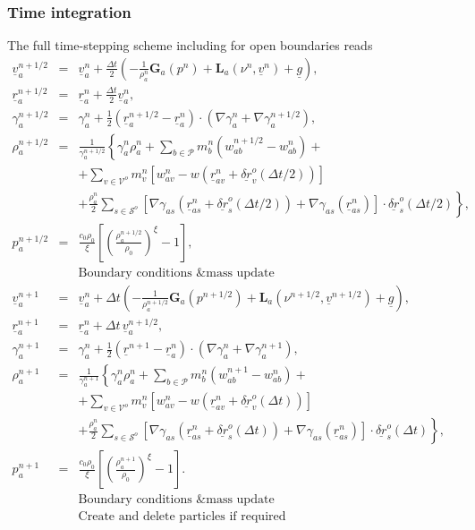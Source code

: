 \documentclass[12pt]{memoir}
\newcommand{\uvec}[1]{\underline{#1}}
\newcommand{\sumP}{\underset{b \in \mathcal{P}}{\sum}}
\newcommand{\Grad}{\textbf{G}}
\newcommand{\Lap}{\textbf{L}}
\begin{document}
\subsubsection{Time integration}
The full time-stepping scheme including for open boundaries reads
\begin{eqnarray}
\uvec{v}_a^{n+1/2} &=& \uvec{v}_a^n + \frac{\Delta t}{2} \left(
-\frac{1}{\rho^n_a}\Grad_a(p^n) + \Lap_a(\nu^n,\uvec{v}^n) + \uvec{g}
\right),
\label{e:open:pred-corr-ns}
\\
\uvec{r}_a^{n+1/2} &=& \uvec{r}_a^{n} + \frac{\Delta t}{2}
\uvec{v}_a^{n},
\nonumber
\\
\gamma_a^{n+1/2} &=& \gamma_a^{n} + \frac{1}{2}
(\uvec{r}_a^{n+1/2} - \uvec{r}_a^{n}) \cdot (\nabla \gamma_a^n + \nabla \gamma_a^{n+1/2}),
\nonumber
\\
\rho_a^{n+1/2} &=& \frac{1}{\gamma_a^{n+1/2}}\left\{ \gamma_a^n \rho_a^n +
\sumP m_b^n (w_{ab}^{n+1/2} - w_{ab}^n) + \right.
\nonumber
\\
&&\left. + \underset{v\in\mathcal{V}^o}{\sum}m_v^n\left[ w_{av}^n -
w\left( \uvec{r}_{av}^n + \uvec{\delta r}_v^o(\Delta t/2) \right) \right]\right.
\nonumber
\\
&&\left. + \frac{\rho_a^n}{2}\underset{s\in\mathcal{S}^o}{\sum}\left[
\nabla\gamma_{as}\left(\uvec{r}_{as}^n + \uvec{\delta r}_s^o(\Delta t/2)\right) +
\nabla\gamma_{as}(\uvec{r}_{as}^n)
\right]\cdot\uvec{\delta r}_s^o(\Delta t/2)\right\},
\nonumber
\\
p_a^{n+1/2} &=& \frac{c_0 \rho_0}{\xi}\left[ \left( \frac{\rho_a^{n+1/2}}{\rho_0}\right)^\xi
-1 \right],
\nonumber
\\
&&\mbox{Boundary conditions \& mass update}
\nonumber
\\
\uvec{v}_a^{n+1} &=& \uvec{v}_a^n + \Delta t \left(
-\frac{1}{\rho^{n+1/2}_a}\Grad_a(p^{n+1/2}) +
\Lap_a(\nu^{n+1/2},\uvec{v}^{n+1/2}) + \uvec{g}
\right),
\nonumber
\\
\uvec{r}_a^{n+1} &=& \uvec{r}_a^{n} + \Delta t\,
\uvec{v}_a^{n+1/2},
\nonumber
\\
\gamma_a^{n+1} &=& \gamma_a^{n} +\frac{1}{2}
(\uvec{r}^{n+1} - \uvec{r}_a^{n}) \cdot (\nabla \gamma_a^n + \nabla \gamma_a^{n+1}),
\nonumber
\\
\rho_a^{n+1} &=& \frac{1}{\gamma_a^{n+1}}\left\{ \gamma_a^n \rho_a^n +
\sumP m_b^n (w_{ab}^{n+1} - w_{ab}^n) + \right.
\nonumber
\\
&&\left. + \underset{v\in\mathcal{V}^o}{\sum}m_v^n\left[ w_{av}^n -
w\left( \uvec{r}_{av}^n + \uvec{\delta r}_v^o(\Delta t) \right) \right]\right.
\nonumber
\\
&&\left. + \frac{\rho_a^n}{2}\underset{s\in\mathcal{S}^o}{\sum}\left[
\nabla\gamma_{as}\left(\uvec{r}_{as}^n + \uvec{\delta r}_s^o(\Delta t)\right) +
\nabla\gamma_{as}(\uvec{r}_{as}^n)
\right]\cdot\uvec{\delta r}_s^o(\Delta t)\right\},
\nonumber
\\
p_a^{n+1} &=& \frac{c_0 \rho_0}{\xi}\left[ \left( \frac{\rho_a^{n+1}}{\rho_0}\right)^\xi
-1 \right].
\nonumber
\\
&&\mbox{Boundary conditions \& mass update}
\nonumber
\\
&&\mbox{Create and delete particles if required}
\nonumber
\end{eqnarray}
\end{document}
